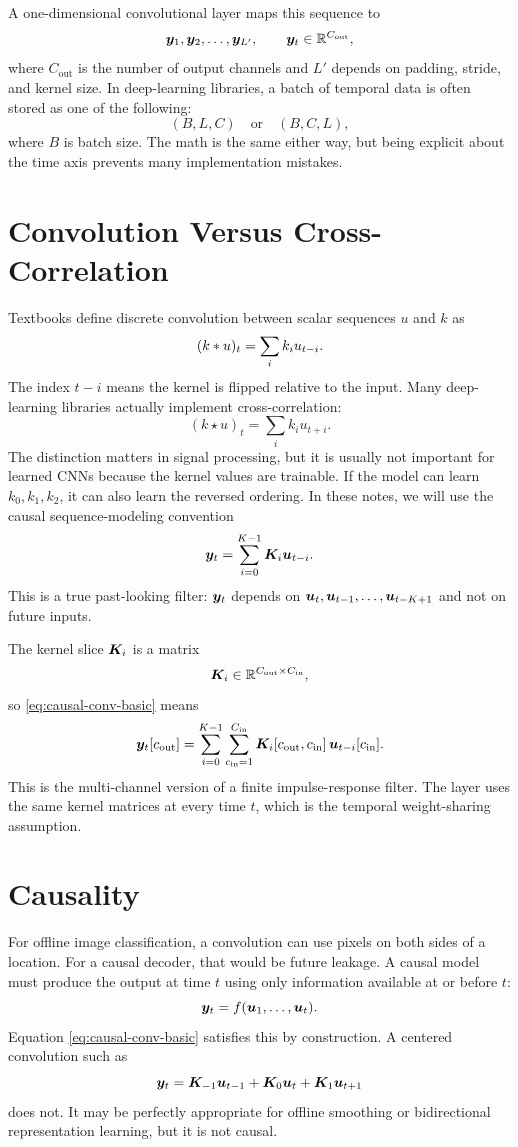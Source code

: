 A one-dimensional convolutional layer maps this sequence to
\[
  \bm{y}_1,\bm{y}_2,\ldots,\bm{y}_{L'},
  \qquad
  \bm{y}_t \in \mathbb{R}^{C_{\mathrm{out}}},
\]
where $C_{\mathrm{out}}$ is the number of output channels and $L'$ depends on padding,
stride, and kernel size. In deep-learning libraries, a batch of temporal data is often
stored as one of the following:
\[
  (B, L, C)
  \quad \text{or} \quad
  (B, C, L),
\]
where $B$ is batch size. The math is the same either way, but being explicit about the
time axis prevents many implementation mistakes.

\section{Convolution Versus Cross-Correlation}

Textbooks define discrete convolution between scalar sequences $u$ and $k$ as
\[
  (k \ast u)_t = \sum_i k_i u_{t-i}.
\]
The index $t-i$ means the kernel is flipped relative to the input. Many deep-learning
libraries actually implement cross-correlation:
\[
  (k \star u)_t = \sum_i k_i u_{t+i}.
\]
The distinction matters in signal processing, but it is usually not important for learned
CNNs because the kernel values are trainable. If the model can learn $k_0,k_1,k_2$, it can
also learn the reversed ordering. In these notes, we will use the causal sequence-modeling
convention
\begin{equation}
  \bm{y}_t = \sum_{i=0}^{K-1} \bm{K}_i \bm{u}_{t-i}.
  \label{eq:causal-conv-basic}
\end{equation}
This is a true past-looking filter: $\bm{y}_t$ depends on $\bm{u}_t,\bm{u}_{t-1},\ldots,\bm{u}_{t-K+1}$
and not on future inputs.

The kernel slice $\bm{K}_i$ is a matrix
\[
  \bm{K}_i \in \mathbb{R}^{C_{\mathrm{out}} \times C_{\mathrm{in}}},
\]
so \eqref{eq:causal-conv-basic} means
\[
  \bm{y}_t[c_{\mathrm{out}}]
  =
  \sum_{i=0}^{K-1}
  \sum_{c_{\mathrm{in}}=1}^{C_{\mathrm{in}}}
  \bm{K}_i[c_{\mathrm{out}},c_{\mathrm{in}}]\,
  \bm{u}_{t-i}[c_{\mathrm{in}}].
\]
This is the multi-channel version of a finite impulse-response filter. The layer uses
the same kernel matrices at every time $t$, which is the temporal weight-sharing
assumption.

\section{Causality}

For offline image classification, a convolution can use pixels on both sides of a location.
For a causal decoder, that would be future leakage. A causal model must produce the output
at time $t$ using only information available at or before $t$:
\[
  \bm{y}_t = f(\bm{u}_1,\ldots,\bm{u}_t).
\]
Equation \eqref{eq:causal-conv-basic} satisfies this by construction. A centered
convolution such as
\[
  \bm{y}_t = \bm{K}_{-1}\bm{u}_{t-1} + \bm{K}_0\bm{u}_t + \bm{K}_{1}\bm{u}_{t+1}
\]
does not. It may be perfectly appropriate for offline smoothing or bidirectional
representation learning, but it is not causal.

